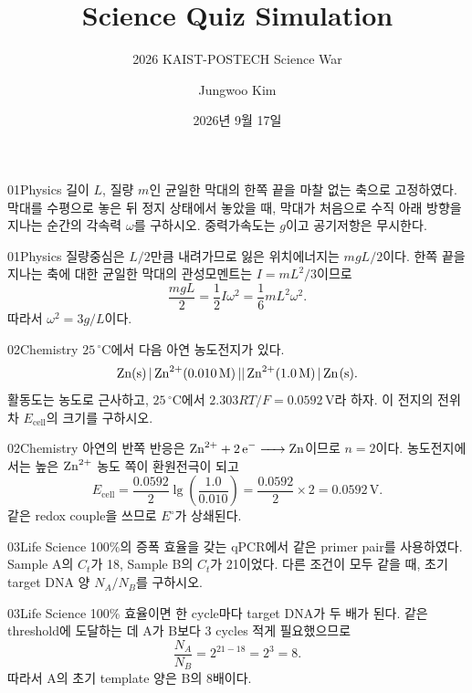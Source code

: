 \documentclass[12pt,aspectratio=169]{beamer}
\title[Science Quiz Simulation]{Science Quiz Simulation}
\subtitle{2026 KAIST-POSTECH Science War}
\author{Jungwoo Kim}
\institute{POSTECH}
\date{2026년 9월 17일}
\begin{document}
\begin{frame}
  \titlepage
\end{frame}
\addtocounter{framenumber}{1}

\begin{problemframe}{01}{Physics}
길이 $L$, 질량 $m$인 균일한 막대의 한쪽 끝을 마찰 없는 축으로 고정하였다. 막대를 수평으로 놓은 뒤 정지 상태에서 놓았을 때, 막대가 처음으로 수직 아래 방향을 지나는 순간의 각속력 $\omega$를 구하시오. 중력가속도는 $g$이고 공기저항은 무시한다.
\end{problemframe}

\begin{solutionframe}{01}{Physics}
질량중심은 $L/2$만큼 내려가므로 잃은 위치에너지는 $mgL/2$이다. 한쪽 끝을 지나는 축에 대한 균일한 막대의 관성모멘트는 $I=mL^2/3$이므로
\[
\frac{mgL}{2}=\frac12 I\omega^2
=\frac16 mL^2\omega^2.
\]
따라서 $\omega^2=3g/L$이다.
\end{solutionframe}

\begin{problemframe}{02}{Chemistry}
$25\,^{\circ}\mathrm{C}$에서 다음 아연 농도전지가 있다.
\[
\ce{Zn(s) | Zn^2+(0.010 M) || Zn^2+(1.0 M) | Zn(s)}.
\]
활동도는 농도로 근사하고, $25\,^{\circ}\mathrm{C}$에서 $2.303RT/F=0.0592\,\mathrm{V}$라 하자. 이 전지의 전위차 $E_{\mathrm{cell}}$의 크기를 구하시오.
\end{problemframe}

\begin{solutionframe}{02}{Chemistry}
아연의 반쪽 반응은 $\ce{Zn^2+ + 2e- -> Zn}$이므로 $n=2$이다. 농도전지에서는 높은 $\ce{Zn^2+}$ 농도 쪽이 환원전극이 되고
\[
E_{\mathrm{cell}}
=\frac{0.0592}{2}\lg\!\left(\frac{1.0}{0.010}\right)
=\frac{0.0592}{2}\times2
=0.0592\,\mathrm{V}.
\]
같은 redox couple을 쓰므로 $E^{\circ}$가 상쇄된다.
\end{solutionframe}

\begin{problemframe}{03}{Life Science}
100\%의 증폭 효율을 갖는 qPCR에서 같은 primer pair를 사용하였다. Sample A의 $C_t$가 18, Sample B의 $C_t$가 21이었다. 다른 조건이 모두 같을 때, 초기 target DNA 양 $N_A/N_B$를 구하시오.
\end{problemframe}

\begin{solutionframe}{03}{Life Science}
100\% 효율이면 한 cycle마다 target DNA가 두 배가 된다. 같은 threshold에 도달하는 데 A가 B보다 3 cycles 적게 필요했으므로
\[
\frac{N_A}{N_B}=2^{21-18}=2^3=8.
\]
따라서 A의 초기 template 양은 B의 8배이다.
\end{solutionframe}
\end{document}
